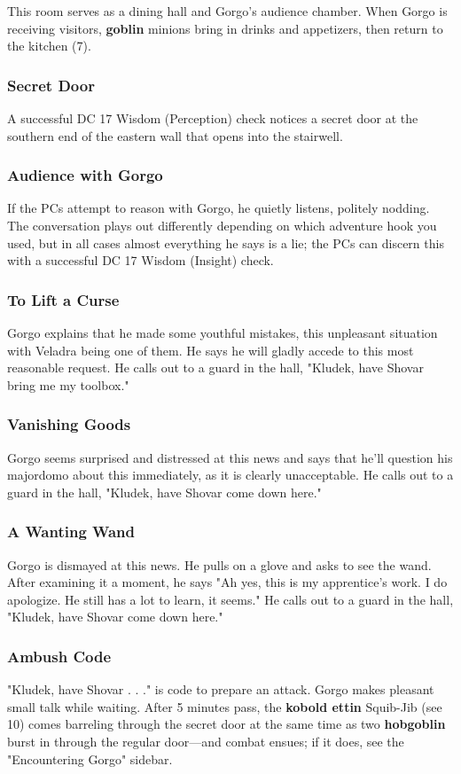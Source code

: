 \documentclass[10pt,a4paper,twoside,bg=print,twocolumn,openany,nodeprecatedcode]{dndbook}
\begin{document}
This room serves as a dining hall and Gorgo's audience chamber. When Gorgo is receiving visitors, \textbf{goblin} minions bring in drinks and appetizers, then return to the kitchen (7).

\subsubsection{Secret Door}
A successful DC 17 Wisdom (Perception) check notices a secret door at the southern end of the eastern wall that opens into the stairwell.

\subsubsection{Audience with Gorgo}
If the PCs attempt to reason with Gorgo, he quietly listens, politely nodding. The conversation plays out differently depending on which adventure hook you used, but in all cases almost everything he says is a lie; the PCs can discern this with a successful DC 17 Wisdom (Insight) check.

\subsubsection{To Lift a Curse}
Gorgo explains that he made some youthful mistakes, this unpleasant situation with Veladra being one of them. He says he will gladly accede to this most reasonable request. He calls out to a guard in the hall, "Kludek, have Shovar bring me my toolbox."

\subsubsection{Vanishing Goods}
Gorgo seems surprised and distressed at this news and says that he'll question his majordomo about this immediately, as it is clearly unacceptable. He calls out to a guard in the hall, "Kludek, have Shovar come down here."

\subsubsection{A Wanting Wand}
Gorgo is dismayed at this news. He pulls on a glove and asks to see the wand. After examining it a moment, he says "Ah yes, this is my apprentice's work. I do apologize. He still has a lot to learn, it seems." He calls out to a guard in the hall, "Kludek, have Shovar come down here."

\subsubsection{Ambush Code}
"Kludek, have Shovar . . ." is code to prepare an attack. Gorgo makes pleasant small talk while waiting. After 5 minutes pass, the \textbf{kobold ettin} Squib-Jib (see 10) comes barreling through the secret door at the same time as two \textbf{hobgoblin} burst in through the regular door—and combat ensues; if it does, see the "Encountering Gorgo" sidebar.
\end{document}
